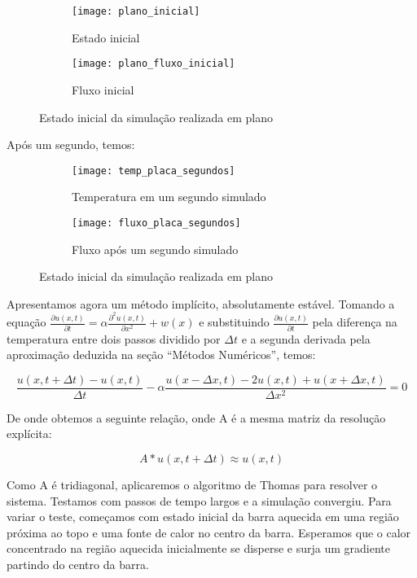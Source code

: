 \documentclass[12pt,fleqn]{article}
\begin{document}
\begin{figure}[H]
	\centering
	\begin{subfigure}{.5\textwidth}
		\centering
		\texttt{[image: plano\_inicial]}
		\caption{Estado inicial}
	\end{subfigure}%
	\begin{subfigure}{.5\textwidth}
		\centering
		\texttt{[image: plano\_fluxo\_inicial]}
		\caption{Fluxo inicial}
	\end{subfigure}
	\caption{Estado inicial da simulação realizada em plano}
\end{figure}

Após um segundo, temos:

\begin{figure}[H]
	\centering
	\begin{subfigure}{.5\textwidth}
		\centering
		\texttt{[image: temp\_placa\_segundos]}
		\caption{Temperatura em um segundo simulado}
	\end{subfigure}%
	\begin{subfigure}{.5\textwidth}
		\centering
		\texttt{[image: fluxo\_placa\_segundos]}
		\caption{Fluxo após um segundo simulado}
	\end{subfigure}
	\caption{Estado inicial da simulação realizada em plano}
\end{figure}

Apresentamos agora um método implícito, absolutamente estável. Tomando a equação $\frac{\partial u(x, t)}{\partial t} = \alpha \frac{\partial^2 u(x, t)}{\partial x^2} + w(x)$ e substituindo $\frac{\partial u(x, t)}{\partial t}$ pela diferença na temperatura entre dois passos dividido por $\Delta t$ e a segunda derivada pela aproximação deduzida na seção ``Métodos Numéricos'', temos:

\[
\frac{u(x, t + \Delta t) - u(x, t)}{\Delta t} - \alpha \frac{u(x - \Delta x, t) - 2 u(x, t) + u(x + \Delta x, t)}{\Delta x^2} = 0
\]

De onde obtemos a seguinte relação, onde A é a mesma matriz da resolução explícita:

\[
A * u(x, t + \Delta t) \approx u(x, t)
\]

Como A é tridiagonal, aplicaremos o algoritmo de Thomas para resolver o sistema. Testamos com passos de tempo largos e a simulação convergiu. Para variar o teste, começamos com estado inicial da barra aquecida em uma região próxima ao topo e uma fonte de calor no centro da barra. Esperamos que o calor concentrado na região aquecida inicialmente se disperse e surja um gradiente partindo do centro da barra.
\end{document}
